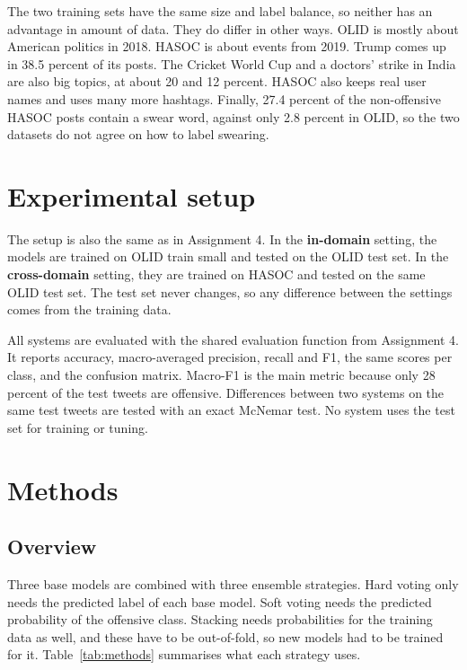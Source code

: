 \documentclass[11pt,a4paper]{article}
\begin{document}
The two training sets have the same size and label balance, so neither has an advantage in amount of data. They do differ in other ways. OLID is mostly about American politics in 2018. HASOC is about events from 2019. Trump comes up in 38.5 percent of its posts. The Cricket World Cup and a doctors' strike in India are also big topics, at about 20 and 12 percent. HASOC also keeps real user names and uses many more hashtags. Finally, 27.4 percent of the non-offensive HASOC posts contain a swear word, against only 2.8 percent in OLID, so the two datasets do not agree on how to label swearing.

\section{Experimental setup}
\label{sec:setup}

The setup is also the same as in Assignment 4. In the \textbf{in-domain} setting, the models are trained on OLID train small and tested on the OLID test set. In the \textbf{cross-domain} setting, they are trained on HASOC and tested on the same OLID test set. The test set never changes, so any difference between the settings comes from the training data.

All systems are evaluated with the shared evaluation function from Assignment 4. It reports accuracy, macro-averaged precision, recall and F1, the same scores per class, and the confusion matrix. Macro-F1 is the main metric because only 28 percent of the test tweets are offensive. Differences between two systems on the same test tweets are tested with an exact McNemar test. No system uses the test set for training or tuning.

\section{Methods}
\label{sec:methods}

\subsection{Overview}

Three base models are combined with three ensemble strategies. Hard voting only needs the predicted label of each base model. Soft voting needs the predicted probability of the offensive class. Stacking needs probabilities for the training data as well, and these have to be out-of-fold, so new models had to be trained for it. Table~\ref{tab:methods} summarises what each strategy uses.
\end{document}
